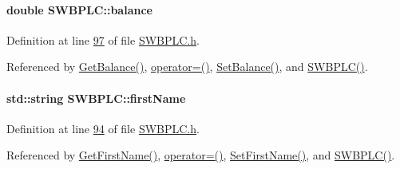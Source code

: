\paragraph[{\texorpdfstring{balance}{balance}}]{\setlength{\rightskip}{0pt plus 5cm}double S\+W\+B\+P\+L\+C\+::balance\hspace{0.3cm}{\ttfamily [private]}}\hypertarget{class_s_w_b_p_l_c_a34365efdc6dde37a4da9a6222dcde389_a34365efdc6dde37a4da9a6222dcde389}{}\label{class_s_w_b_p_l_c_a34365efdc6dde37a4da9a6222dcde389_a34365efdc6dde37a4da9a6222dcde389}


Definition at line \hyperlink{_s_w_b_p_l_c_8h_source_l00097}{97} of file \hyperlink{_s_w_b_p_l_c_8h_source}{S\+W\+B\+P\+L\+C.\+h}.



Referenced by \hyperlink{_s_w_b_p_l_c_8cpp_source_l00072}{Get\+Balance()}, \hyperlink{_s_w_b_p_l_c_8h_source_l00063}{operator=()}, \hyperlink{_s_w_b_p_l_c_8cpp_source_l00068}{Set\+Balance()}, and \hyperlink{_s_w_b_p_l_c_8h_source_l00024}{S\+W\+B\+P\+L\+C()}.

\paragraph[{\texorpdfstring{first\+Name}{firstName}}]{\setlength{\rightskip}{0pt plus 5cm}std\+::string S\+W\+B\+P\+L\+C\+::first\+Name\hspace{0.3cm}{\ttfamily [private]}}\hypertarget{class_s_w_b_p_l_c_a38fd4817afe4aaac4993b0b4c7074b9c_a38fd4817afe4aaac4993b0b4c7074b9c}{}\label{class_s_w_b_p_l_c_a38fd4817afe4aaac4993b0b4c7074b9c_a38fd4817afe4aaac4993b0b4c7074b9c}


Definition at line \hyperlink{_s_w_b_p_l_c_8h_source_l00094}{94} of file \hyperlink{_s_w_b_p_l_c_8h_source}{S\+W\+B\+P\+L\+C.\+h}.



Referenced by \hyperlink{_s_w_b_p_l_c_8cpp_source_l00096}{Get\+First\+Name()}, \hyperlink{_s_w_b_p_l_c_8h_source_l00063}{operator=()}, \hyperlink{_s_w_b_p_l_c_8cpp_source_l00092}{Set\+First\+Name()}, and \hyperlink{_s_w_b_p_l_c_8h_source_l00024}{S\+W\+B\+P\+L\+C()}.

